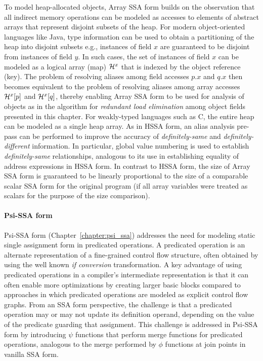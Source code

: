 To model heap-allocated objects, Array SSA form builds on the observation that all indirect memory operations can be modeled as accesses to elements of abstract arrays that represent disjoint subsets of the heap.  For modern object-oriented languages like Java, type information can be used to obtain a partitioning of the heap into disjoint subsets e.g.,  instances of field $x$ are guaranteed to be disjoint from instances of field $y$.  In such cases, the set of instances of field $x$ can be modeled as a logical array (map) ${\cal H}^x$ that is indexed by the object reference (key).  The problem of resolving aliases among field accesses $p.x$ and $q.x$ then becomes equivalent to the problem of resolving aliases among array accesses ${\cal H}^x[p]$ and ${\cal H}^x[q]$, thereby enabling Array SSA form to be used for analysis of objects as in the algorithm for {\em redundant load elimination} among object fields presented in this chapter.  For weakly-typed languages such as C, the entire heap can be modeled as a single heap array.  As in HSSA form, an alias analysis pre-pass can be performed to improve the accuracy of {\em definitely-same} and {\em definitely-different} information.  In particular, global value numbering is used to establish  {\em definitely-same} relationships, analogous to its use in establishing equality of address expressions in HSSA form.  In contrast to HSSA form, the size of Array SSA form is guaranteed to be linearly proportional to the size of a comparable scalar SSA form for the original program (if all array variables were treated as scalars for the purpose of the size comparison).

\paragraph{Psi-SSA form}

Psi-SSA form  (Chapter~\ref{chapter:psi_ssa}) addresses the need for modeling static single assignment form in predicated operations.  
A predicated operation is an alternate representation of a fine-grained control flow structure, often obtained by using the well known {\em if conversion} transformation.  A key advantage of using predicated operations in a compiler's intermediate representation is that it can often enable more optimizations by creating larger basic blocks compared to approaches in which predicated operations are modeled as explicit control flow graphs.  From an SSA form perspective, the challenge is that a predicated operation may or may not update its definition operand, depending on the value of the predicate guarding that assignment.  This challenge is addressed in Psi-SSA form by introducing $\psi$ functions that perform merge functions for predicated operations, analogous to the merge performed by $\phi$ functions at join points in vanilla SSA form.


